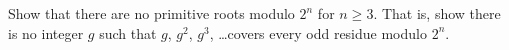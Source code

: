 \begin{problem}
    Show that there are no primitive roots modulo $2^n$ for $n \ge 3$.
    That is, show there is no integer $g$ such that
    $g$, $g^2$, $g^3$, \dots covers every odd residue modulo $2^n$.
    \label{Z2F0B95F}
\end{problem}